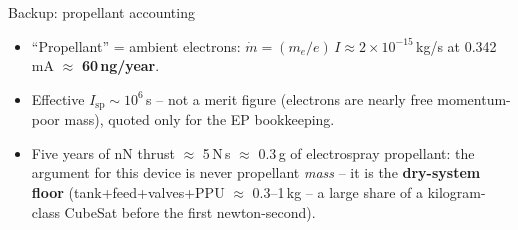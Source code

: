 \documentclass[10pt,aspectratio=169]{beamer}
\begin{document}
\begin{frame}{Backup: propellant accounting}
  \begin{itemize}\small
    \item ``Propellant'' = ambient electrons: $\dot m = (m_e/e)\,I \approx
          2\times10^{-15}$\,kg/s at 0.342\,mA $\approx$ \textbf{60\,ng/year}.
    \item Effective $I_{\mathrm{sp}} \sim 10^{6}$\,s -- not a merit figure
          (electrons are nearly free momentum-poor mass), quoted only for
          the EP bookkeeping.
    \item Five years of nN thrust $\approx$ 5\,N\,s $\approx$ 0.3\,g of
          electrospray propellant: the argument for this device is never
          propellant \emph{mass} -- it is the \textbf{dry-system floor}
          (tank+feed+valves+PPU $\approx$ 0.3--1\,kg -- a large share of a
          kilogram-class CubeSat before the first newton-second).
  \end{itemize}
\end{frame}
\end{document}
